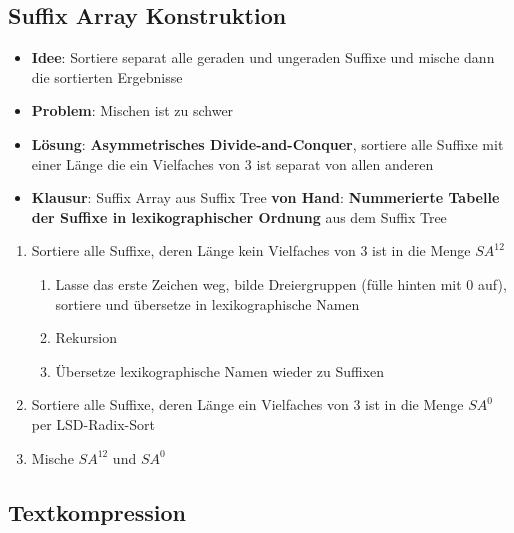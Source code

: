 \subsection{Suffix Array Konstruktion}%
\label{str:sub:suffix_array_konstruktion}

\begin{itemize}
	\item \textbf{Idee}: Sortiere separat alle geraden und ungeraden Suffixe und mische dann die sortierten Ergebnisse
	\item \textbf{Problem}: Mischen ist zu schwer
	\item \textbf{Lösung}: \textbf{Asymmetrisches Divide-and-Conquer}, sortiere alle Suffixe mit einer Länge die ein Vielfaches von 3 ist separat von allen anderen
	\item \textbf{Klausur}: Suffix Array aus Suffix Tree \textbf{von Hand}: \textbf{Nummerierte Tabelle der Suffixe in lexikographischer Ordnung} aus dem Suffix Tree
\end{itemize}

\begin{enumerate}
	\item Sortiere alle Suffixe, deren Länge kein Vielfaches von $3$ ist in die Menge $SA^{12}$
	\begin{enumerate}
		\item Lasse das erste Zeichen weg, bilde Dreiergruppen (fülle hinten mit $0$ auf), sortiere und übersetze in lexikographische Namen
		\item Rekursion %
		\item Übersetze lexikographische Namen wieder zu Suffixen
	\end{enumerate}
	\item Sortiere alle Suffixe, deren Länge ein Vielfaches von $3$ ist in die Menge $SA^0$ per LSD-Radix-Sort
	\item Mische $SA^{12}$ und $SA^0$
\end{enumerate}

\subsection{Textkompression}%
\label{str:sub:textkompression}

